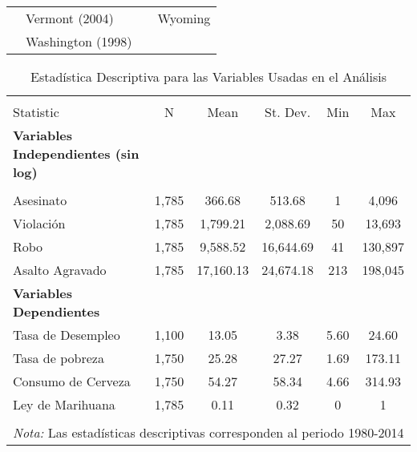 \documentclass[11pt,]{article}
\begin{document}
\begin{longtable}[]{@{}llll@{}}
\begin{minipage}[t]{0.20\columnwidth}
\strut
\end{minipage} & \begin{minipage}[t]{0.26\columnwidth}\raggedright
Vermont (2004)\strut
\end{minipage} & \begin{minipage}[t]{0.24\columnwidth}\raggedright
\strut
\end{minipage} & \begin{minipage}[t]{0.19\columnwidth}\raggedright
Wyoming\strut
\end{minipage}\tabularnewline
\begin{minipage}[t]{0.20\columnwidth}\raggedright
\strut
\end{minipage} & \begin{minipage}[t]{0.26\columnwidth}\raggedright
Washington (1998)\strut
\end{minipage} & \begin{minipage}[t]{0.24\columnwidth}\raggedright
\strut
\end{minipage} & \begin{minipage}[t]{0.19\columnwidth}\raggedright
\strut
\end{minipage}\tabularnewline
\bottomrule
\end{longtable}

\begin{table}[!htbp] \centering 
  \caption{Estadística Descriptiva para las Variables Usadas en el Análisis} 
  \label{tab:descript} 
\small 
\begin{tabular}{@{\extracolsep{5pt}}lccccc} 
\\[-1.8ex]\hline \\[-1.8ex] 
Statistic & \multicolumn{1}{c}{N} & \multicolumn{1}{c}{Mean} & \multicolumn{1}{c}{St. Dev.} & \multicolumn{1}{c}{Min} & \multicolumn{1}{c}{Max} \\ 
\hline 
\hline
{\bf Variables Independientes (sin log)} & & & & & \\
\hline \\[-1.8ex] 
Asesinato & 1,785 & 366.68 & 513.68 & 1 & 4,096 \\ 
Violación & 1,785 & 1,799.21 & 2,088.69 & 50 & 13,693 \\ 
Robo & 1,785 & 9,588.52 & 16,644.69 & 41 & 130,897 \\ 
Asalto Agravado & 1,785 & 17,160.13 & 24,674.18 & 213 & 198,045 \\ 
\hline
{\bf Variables Dependientes} & & & & & \\
\hline
Tasa de Desempleo & 1,100 & 13.05 & 3.38 & 5.60 & 24.60 \\ 
Tasa de pobreza & 1,750 & 25.28 & 27.27 & 1.69 & 173.11 \\ 
Consumo de Cerveza & 1,750 & 54.27 & 58.34 & 4.66 & 314.93 \\ 
Ley de Marihuana & 1,785 & 0.11 & 0.32 & 0 & 1 \\ 
\hline 
\hline \\[-1.8ex] 
\multicolumn{6}{l}{\textit{Nota:} Las estadísticas descriptivas corresponden al periodo 1980-2014} \\ 
\end{tabular} 
\end{table}
\end{document}
